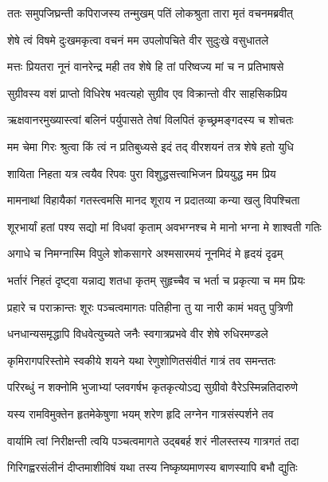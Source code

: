 
\twolineshloka
{ततः समुपजिघ्रन्ती कपिराजस्य तन्मुखम्}
{पतिं लोकश्रुता तारा मृतं वचनमब्रवीत्} %

\twolineshloka
{शेषे त्वं विषमे दुःखमकृत्वा वचनं मम}
{उपलोपचिते वीर सुदुःखे वसुधातले} %

\twolineshloka
{मत्तः प्रियतरा नूनं वानरेन्द्र मही तव}
{शेषे हि तां परिष्वज्य मां च न प्रतिभाषसे} %

\twolineshloka
{सुग्रीवस्य वशं प्राप्तो विधिरेष भवत्यहो}
{सुग्रीव एव विक्रान्तो वीर साहसिकप्रिय} %

\twolineshloka
{ऋक्षवानरमुख्यास्त्वां बलिनं पर्युपासते}
{तेषां विलपितं कृच्छ्रमङ्गदस्य च शोचतः} %

\twolineshloka
{मम चेमा गिरः श्रुत्वा किं त्वं न प्रतिबुध्यसे}
{इदं तद् वीरशयनं तत्र शेषे हतो युधि} %

\twolineshloka
{शायिता निहता यत्र त्वयैव रिपवः पुरा}
{विशुद्धसत्त्वाभिजन प्रिययुद्ध मम प्रिय} %

\twolineshloka
{मामनाथां विहायैकां गतस्त्वमसि मानद}
{शूराय न प्रदातव्या कन्या खलु विपश्चिता} %

\twolineshloka
{शूरभार्यां हतां पश्य सद्यो मां विधवां कृताम्}
{अवभग्नश्च मे मानो भग्ना मे शाश्वती गतिः} %

\twolineshloka
{अगाधे च निमग्नास्मि विपुले शोकसागरे}
{अश्मसारमयं नूनमिदं मे हृदयं दृढम्} %

\twolineshloka
{भर्तारं निहतं दृष्ट्वा यन्नाद्य शतधा कृतम्}
{सुहृच्चैव च भर्ता च प्रकृत्या च मम प्रियः} %

\twolineshloka
{प्रहारे च पराक्रान्तः शूरः पञ्चत्वमागतः}
{पतिहीना तु या नारी कामं भवतु पुत्रिणी} %

\twolineshloka
{धनधान्यसमृद्धापि विधवेत्युच्यते जनैः}
{स्वगात्रप्रभवे वीर शेषे रुधिरमण्डले} %

\twolineshloka
{कृमिरागपरिस्तोमे स्वकीये शयने यथा}
{रेणुशोणितसंवीतं गात्रं तव समन्ततः} %

\twolineshloka
{परिरब्धुं न शक्नोमि भुजाभ्यां प्लवगर्षभ}
{कृतकृत्योऽद्य सुग्रीवो वैरेऽस्मिन्नतिदारुणे} %

\twolineshloka
{यस्य रामविमुक्तेन हृतमेकेषुणा भयम्}
{शरेण हृदि लग्नेन गात्रसंस्पर्शने तव} %

\twolineshloka
{वार्यामि त्वां निरीक्षन्ती त्वयि पञ्चत्वमागते}
{उद्बबर्ह शरं नीलस्तस्य गात्रगतं तदा} %

\twolineshloka
{गिरिगह्वरसंलीनं दीप्तमाशीविषं यथा}
{तस्य निष्कृष्यमाणस्य बाणस्यापि बभौ द्युतिः} %

